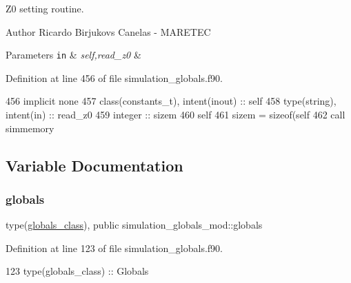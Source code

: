 Z0 setting routine. 

\begin{DoxyAuthor}{Author}
Ricardo Birjukovs Canelas -\/ M\+A\+R\+E\+T\+EC 
\end{DoxyAuthor}

\begin{DoxyParams}[1]{Parameters}
\mbox{\tt in}  & {\em self,read\+\_\+z0} & \\
\hline
\end{DoxyParams}


Definition at line 456 of file simulation\+\_\+globals.\+f90.


\begin{DoxyCode}
456     \textcolor{keywordtype}{implicit none}
457     \textcolor{keywordtype}{class}(constants\_t), \textcolor{keywordtype}{intent(inout)} :: self
458     \textcolor{keywordtype}{type}(string), \textcolor{keywordtype}{intent(in)} :: read\_z0
459     \textcolor{keywordtype}{integer} :: sizem
460     self%
461     sizem = sizeof(self%
462     \textcolor{keyword}{call }simmemory%
\end{DoxyCode}


\subsection{Variable Documentation}
\mbox{\label{namespacesimulation__globals__mod_a04123075b6de525703edb89697fc39e9}} 
\subsubsection{\texorpdfstring{globals}{globals}}
{\footnotesize\ttfamily type(\mbox{\hyperlink{structsimulation__globals__mod_1_1globals__class}{globals\+\_\+class}}), public simulation\+\_\+globals\+\_\+mod\+::globals}



Definition at line 123 of file simulation\+\_\+globals.\+f90.


\begin{DoxyCode}
123     \textcolor{keywordtype}{type}(globals\_class) :: Globals
\end{DoxyCode}
